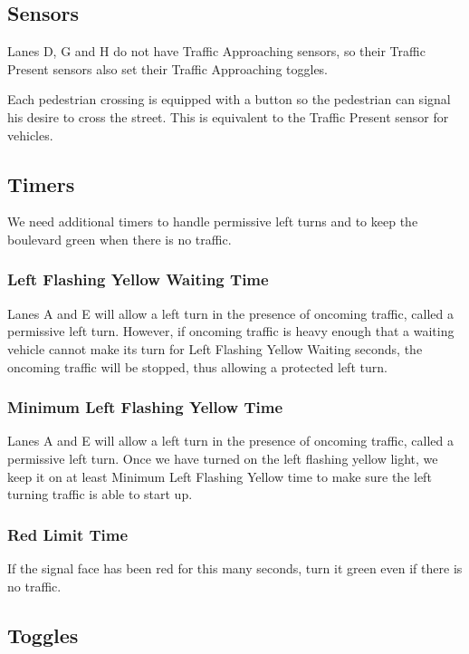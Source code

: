\documentclass[letterpaper,twoside]{article}
\begin{document}
\subsection{Sensors}

Lanes D, G and H do not have Traffic Approaching sensors, so their
Traffic Present sensors also set their Traffic Approaching toggles.

Each pedestrian crossing is equipped with a button so the pedestrian can
signal his desire to cross the street.  This is equivalent to the
Traffic Present sensor for vehicles.

\subsection{Timers}

We need additional timers to handle permissive left turns and to
keep the boulevard green when there is no traffic.

\subsubsection{Left Flashing Yellow Waiting Time}

Lanes A and E will allow a left turn in the presence of oncoming traffic,
called a permissive left turn. However, if oncoming traffic is heavy enough
that a waiting vehicle cannot make its turn for Left Flashing Yellow Waiting
seconds, the oncoming traffic will be stopped, thus allowing a protected left
turn.

\subsubsection{Minimum Left Flashing Yellow Time}

Lanes A and E will allow a left turn in the presence of oncoming traffic,
called a permissive left turn. Once we have turned on the left flashing
yellow light, we keep it on at least Minimum Left Flashing Yellow time
to make sure the left turning traffic is able to start up.

\subsubsection{Red Limit Time}
If the signal face has been red for this many seconds, turn it green
even if there is no traffic.

\subsection{Toggles}
\end{document}

